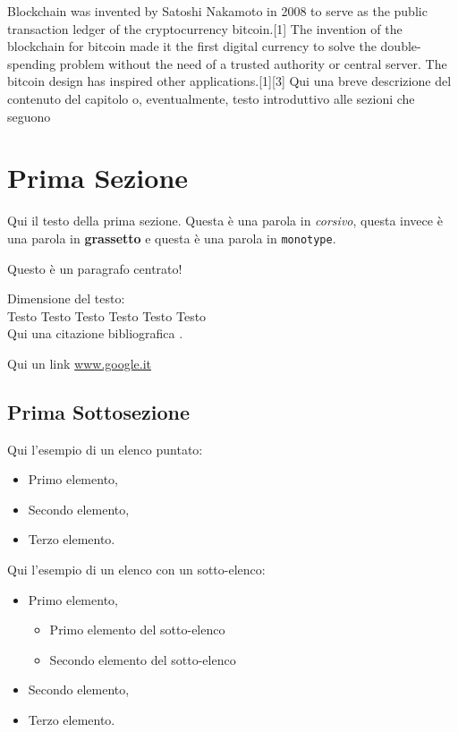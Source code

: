 Blockchain was invented by Satoshi Nakamoto in 2008 to serve as the public transaction ledger of the cryptocurrency bitcoin.[1] The invention of the blockchain for bitcoin made it the first digital currency to solve the double-spending problem without the need of a trusted authority or central server. The bitcoin design has inspired other applications.[1][3]
Qui una breve descrizione del contenuto del capitolo o, eventualmente, testo introduttivo alle sezioni che seguono

\section{Prima Sezione}
Qui il testo della prima sezione. Questa è  una parola in \textit{corsivo}, questa invece è una parola in \textbf{grassetto} e questa è una parola in \texttt{monotype}.

\begin{center}
Questo è un paragrafo centrato!
\end{center}

Dimensione del testo:\\

\LARGE{Testo} \Large{Testo} \large{Testo} \normalsize{Testo} \small{Testo} \footnotesize{Testo}\\

Qui una citazione bibliografica \cite{bib001}.

Qui un link \url{www.google.it}


\subsection{Prima Sottosezione}

Qui l'esempio di un elenco puntato:

\begin{itemize}
\item Primo elemento,
\item Secondo elemento,
\item Terzo elemento.
\end{itemize}

Qui l'esempio di un elenco con un sotto-elenco:

\begin{itemize}
\item Primo elemento,
\begin{itemize}
\item Primo elemento del sotto-elenco
\item Secondo elemento del sotto-elenco
\end{itemize}
\item Secondo elemento,
\item Terzo elemento.
\end{itemize}

